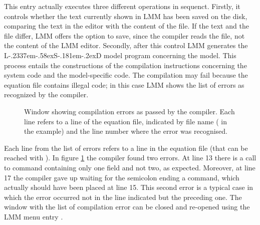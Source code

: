 \documentclass [11pt,a4paper] {book}
\def\LsD{{L\kern-.2337em\lower-.58ex\hbox{S}\kern-.181em\lower-.2ex\hbox{D}}\xspace}
\begin{document}
This entry actually executes three different operations in sequenct. Firstly, it controls whether the text currently shown in LMM has been saved on the disk, comparing the text in the editor with the content of the file. If the text and the file differ, LMM offers the option to save, since the compiler reads the file, not the content of the LMM editor. 
Secondly, after this control LMM generates the \LsD model program concerning the model. This process entails the constructions of the compilation instructions concerning the system code and the model-specific code.  The compilation may fail because the equation file contains illegal code; in this case LMM shows the list of errors as recognized by the compiler.

\begin{figure}[ht]
  \centering
  \caption{Window showing compilation errors as passed by the compiler. Each line refers to a line of the equation file, indicated by file name ( in the example) and the line number where the error was recognised.}
  \label{fig:comp_err}
\end{figure}


Each line from the list of errors refers to a line in the equation file (that can be reached with ). In figure \ref{fig:comp_err} the compiler found two errors. At line 13 there is a call to command  containing only one field and not two, as expected. Moreover, at line 17 the compiler gave up waiting for the semicolon \code{;} ending a command, which actually should have been placed at line 15. This second error is a typical case in which the error occurred not in the line indicated but the preceding one. The window with the list of compilation error can be closed and re-opened using the LMM menu entry  .
\end{document}
